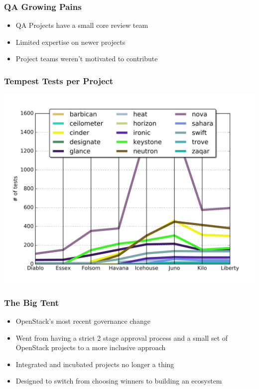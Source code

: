 \documentclass[aspectratio=169,11pt,hyperref={colorlinks=true}]{beamer}
\begin{document}
\begin{frame}
    \frametitle{QA Growing Pains}
    \begin{itemize}
        \item QA Projects have a small core review team
        \item Limited expertise on newer projects
        \item Project teams weren't motivated to contribute
    \end{itemize}
\end{frame}

\begin{frame}
    \frametitle{Tempest Tests per Project}
    \begin{center}
        \includegraphics[width=.75\textwidth]{tests_per_proj.png}
    \end{center}
\end{frame}

\begin{frame}
    \frametitle{The Big Tent}
    \begin{itemize}
        \item OpenStack's most recent governance change
        \item Went from having a strict 2 stage approval process and a small
            set of OpenStack projects to a more inclusive approach
        \item Integrated and incubated projects no longer a thing
        \item Designed to switch from choosing winners to building an ecosystem
    \end{itemize}
\end{frame}
\end{document}
